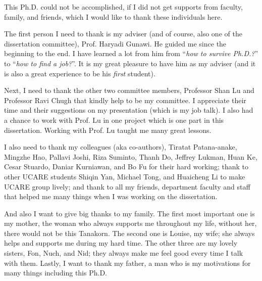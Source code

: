 This Ph.D. could not be accomplished, if I did not get supports from faculty,
family, and friends, which I would like to thank these individuals here.

The first person I need to thank is my adviser (and of course, also one of the
dissertation committee), Prof. Haryadi Gunawi. He guided me since the beginning
to the end. I have learned a lot from him from ``\textit{how to survive
Ph.D.?}'' to ``\textit{how to find a job?}''. It is my great pleasure to have him
as my adviser (and it is also a great experience to be his \textit{first}
student).

Next, I need to thank the other two committee members, Professor Shan Lu and
Professor Ravi Chugh that kindly help to be my committee. I appreciate their
time and their suggestions on my presentation (which is my job talk). I also had
a chance to work with Prof. Lu in one project which is one part in this
dissertation.  Working with Prof. Lu taught me many great lessons.

I also need to thank my colleagues (aka co-authors), Tiratat Patana-anake,
Mingzhe Hao, Pallavi Joshi, Riza Suminto, Thanh Do, Jeffrey Lukman, Huan Ke,
Cesar Stuardo, Daniar Kurniawan, and Bo Fu for their hard working; thank to
other UCARE students Shiqin Yan, Michael Tong, and Huaicheng Li to make UCARE
group lively; and thank to all my friends, department faculty and staff that
helped me many things when I was working on the dissertation.

And also I want to give big thanks to my family. The first most important one is
my mother, the woman who always supports me throughout my life, without her,
there would not be this Tanakorn. The second one is Louise, my wife; she always
helps and supports me during my hard time. The other three are my lovely
sisters, Fon, Nuch, and Nid; they always make me feel good every time I talk with
them. Lastly, I want to thank my father, a man who is my motivations for many
things including this Ph.D.

